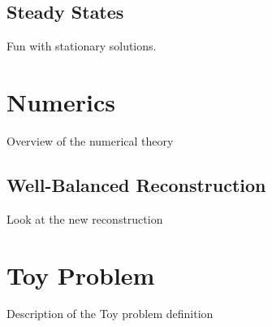 \subsection{Steady States}

Fun with stationary solutions.


\section{Numerics}
\label{sec:numerics}

Overview of the numerical theory

\subsection{Well-Balanced Reconstruction}

Look at the new reconstruction


\section{Toy Problem}
\label{sec:toyProblem}

Description of the Toy problem definition